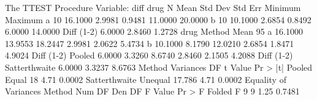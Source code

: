 \documentclass{article}
\begin{document}
\begin{Woutput}
The TTEST Procedure
Variable:  diff
drug            N        Mean     Std Dev     Std Err     Minimum     Maximum
a              10     16.1000      2.9981      0.9481     11.0000     20.0000
b              10     10.1000      2.6854      0.8492      6.0000     14.0000
Diff (1-2)             6.0000      2.8460      1.2728
drug          Method               Mean       95%
a                               16.1000     13.9553  18.2447      2.9981      2.0622   5.4734
b                               10.1000      8.1790  12.0210      2.6854      1.8471   4.9024
Diff (1-2)    Pooled             6.0000      3.3260   8.6740      2.8460      2.1505   4.2088
Diff (1-2)    Satterthwaite      6.0000      3.3237   8.6763
Method           Variances        DF    t Value    Pr > |t|
Pooled           Equal            18       4.71      0.0002
Satterthwaite    Unequal      17.786       4.71      0.0002
              Equality of Variances
Method      Num DF    Den DF    F Value    Pr > F
Folded F         9         9       1.25    0.7481
\end{Woutput}
\end{document}
